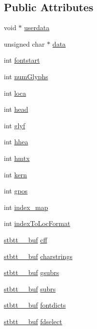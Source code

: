 \subsection*{Public Attributes}
\begin{DoxyCompactItemize}
\item 
void $\ast$ \mbox{\hyperlink{structstbtt__fontinfo_a9c81078df96a7a3f730137151efab285}{userdata}}
\item 
unsigned char $\ast$ \mbox{\hyperlink{structstbtt__fontinfo_af348db379cf0e0e71a68603d00501d41}{data}}
\item 
int \mbox{\hyperlink{structstbtt__fontinfo_a139234d825b585afa27748a1f3d10c7d}{fontstart}}
\item 
int \mbox{\hyperlink{structstbtt__fontinfo_a60ad8301a98eb7cd91472ce846d9080d}{num\+Glyphs}}
\item 
int \mbox{\hyperlink{structstbtt__fontinfo_a15344195b181b50bde4f59ae7ca248c0}{loca}}
\item 
int \mbox{\hyperlink{structstbtt__fontinfo_ab76ed2f4cbd8fcbd8465ca5f88e7e2b9}{head}}
\item 
int \mbox{\hyperlink{structstbtt__fontinfo_a5de2129e0a415748920f6aa10ceee6e5}{glyf}}
\item 
int \mbox{\hyperlink{structstbtt__fontinfo_a91b82ae03d68892eb7f3fbd3a8b990e5}{hhea}}
\item 
int \mbox{\hyperlink{structstbtt__fontinfo_aebf42701e99b88d07a59bf99cb84b9a1}{hmtx}}
\item 
int \mbox{\hyperlink{structstbtt__fontinfo_a57cc83512daea60e97ed49354d634d37}{kern}}
\item 
int \mbox{\hyperlink{structstbtt__fontinfo_aeb6732549a55fa30235d0c0ecd743022}{gpos}}
\item 
int \mbox{\hyperlink{structstbtt__fontinfo_a0b95e3ac0c397b72b7696ce6696eb189}{index\+\_\+map}}
\item 
int \mbox{\hyperlink{structstbtt__fontinfo_a5fa117a7ef058111a70a5b0b87d220f4}{index\+To\+Loc\+Format}}
\item 
\mbox{\hyperlink{structstbtt____buf}{stbtt\+\_\+\+\_\+buf}} \mbox{\hyperlink{structstbtt__fontinfo_a6031b4bda94aa2b5ff07ef5d626a15a4}{cff}}
\item 
\mbox{\hyperlink{structstbtt____buf}{stbtt\+\_\+\+\_\+buf}} \mbox{\hyperlink{structstbtt__fontinfo_aaf04a69f8dd4b6a8bed4191b57145082}{charstrings}}
\item 
\mbox{\hyperlink{structstbtt____buf}{stbtt\+\_\+\+\_\+buf}} \mbox{\hyperlink{structstbtt__fontinfo_afc5bfc4a52ad0e3879f0f81a372da7fb}{gsubrs}}
\item 
\mbox{\hyperlink{structstbtt____buf}{stbtt\+\_\+\+\_\+buf}} \mbox{\hyperlink{structstbtt__fontinfo_aebc496bb1c001a8a90e0e66da16107d2}{subrs}}
\item 
\mbox{\hyperlink{structstbtt____buf}{stbtt\+\_\+\+\_\+buf}} \mbox{\hyperlink{structstbtt__fontinfo_a966c70ac9548a02fff558846fbce3677}{fontdicts}}
\item 
\mbox{\hyperlink{structstbtt____buf}{stbtt\+\_\+\+\_\+buf}} \mbox{\hyperlink{structstbtt__fontinfo_a4e06b1c29295a9aba529105e88fe1d71}{fdselect}}
\end{DoxyCompactItemize}


